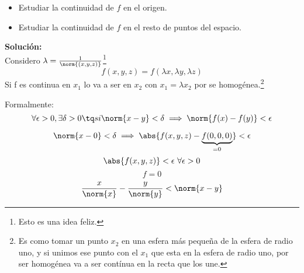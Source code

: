 \documentclass{apuntes}
\begin{document}
\begin{itemize}
\item Estudiar la continuidad de $f$ en el origen.
\item Estudiar la continuidad de $f$ en el resto de puntos del espacio.
\end{itemize}

\textbf{Solución:}\\
Considero $\lambda = \frac{1}{\norm{(x,y,z)}}$\footnote{Esto es una idea feliz.}\\
$$f(x,y,z) = f(\lambda x, \lambda y, \lambda z)$$
Si f es continua en $x_1$ lo va a ser en $x_2$ con $x_1 = \lambda x_2$ por se homogénea.\footnote{Es como tomar un punto $x_2$ en una esfera más pequeña de la esfera de radio uno, y si unimos ese punto con el $x_1$ que esta en la esfera de radio uno, por ser homogénea va a ser contínua en la recta que los une.}

Formalmente:
$$\forall \epsilon > 0, \exists \delta > 0 \tq si \norm{x-y} < \delta \implies \norm{f(x) - f(y)} < \epsilon$$

$$\norm{x - 0} < \delta \implies \abs{f(x,y,z) - \underbrace{f(0,0,0)}_{=0}} < \epsilon$$
$$\abs{f(x,y,z)} < \epsilon\ \forall \epsilon > 0$$
$$ f = 0$$
$$ \frac{x}{\norm{x}} - \frac{y}{\norm{y}} < \norm{x-y}$$
\end{document}
